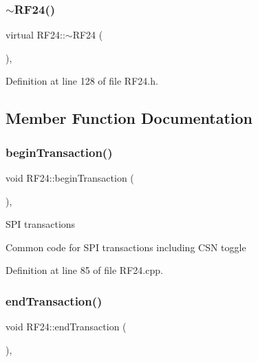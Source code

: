 \subsubsection{\texorpdfstring{$\sim$\+R\+F24()}{~RF24()}}
{\footnotesize\ttfamily virtual R\+F24\+::$\sim$\+R\+F24 (\begin{DoxyParamCaption}{ }\end{DoxyParamCaption})\hspace{0.3cm}{\ttfamily [inline]}, {\ttfamily [virtual]}}



Definition at line 128 of file R\+F24.\+h.



\subsection{Member Function Documentation}
\mbox{\label{classRF24_a5a669f1c68203d5317f8f452a2bff1b5}} 
\subsubsection{\texorpdfstring{begin\+Transaction()}{beginTransaction()}}
{\footnotesize\ttfamily void R\+F24\+::begin\+Transaction (\begin{DoxyParamCaption}{ }\end{DoxyParamCaption})\hspace{0.3cm}{\ttfamily [inline]}, {\ttfamily [protected]}}

S\+PI transactions

Common code for S\+PI transactions including C\+SN toggle 

Definition at line 85 of file R\+F24.\+cpp.

\mbox{\label{classRF24_a2b196efad61a1b8a9bf493150901edb4}} 
\subsubsection{\texorpdfstring{end\+Transaction()}{endTransaction()}}
{\footnotesize\ttfamily void R\+F24\+::end\+Transaction (\begin{DoxyParamCaption}{ }\end{DoxyParamCaption})\hspace{0.3cm}{\ttfamily [inline]}, {\ttfamily [protected]}}



